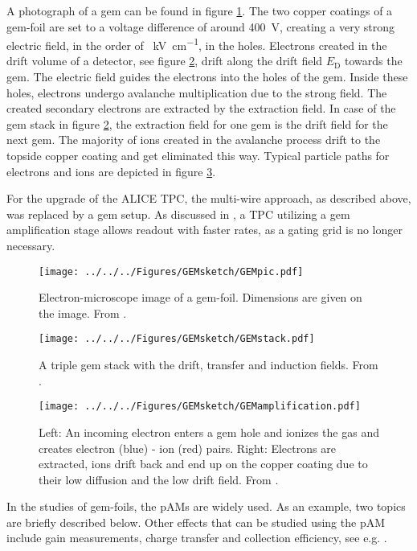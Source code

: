 A photograph of a \ac{gem} can be found in figure \ref{fig:theory:gem:foto}. The two copper coatings of a \ac{gem}-foil are set to a voltage difference of around \SI{400}{\volt}, creating a very strong electric field, in the order of \SI{}{\kilo\volt\per\centi\meter}, in the holes. 
Electrons created in the drift volume of a detector, see figure \ref{fig:theory:gem:stack}, drift along the drift field $E_\text{D}$ towards the \ac{gem}. The electric field guides the electrons into the holes of the \ac{gem}.
Inside these holes, electrons undergo avalanche multiplication due to the strong field. The created secondary electrons are extracted by the extraction field. In case of the \ac{gem} stack in figure \ref{fig:theory:gem:stack}, the extraction field for one \ac{gem} is the drift field for the next \ac{gem}. The majority of ions created in the avalanche process drift to the topside copper coating and get eliminated this way. Typical particle paths for electrons and ions are depicted in figure \ref{fig:theory:gem:field}.

For the upgrade of the \ac{ALICE} \ac{TPC}, the multi-wire approach, as described above, was replaced by a \ac{gem} setup. As discussed in \cite{gemamplification}, a \ac{TPC} utilizing a \ac{gem} amplification stage allows readout with faster rates, as a gating grid is no longer necessary. 
\begin{figure}
	\centering
	\texttt{[image: ../../../Figures/GEMsketch/GEMpic.pdf]}
	\caption{Electron-microscope image of a \ac{gem}-foil. Dimensions are given on the image. From \cite{sauligem}.}
	\label{fig:theory:gem:foto}
\end{figure}
\begin{figure}
	\centering
	\texttt{[image: ../../../Figures/GEMsketch/GEMstack.pdf]}
	\caption{A triple \ac{gem} stack with the drift, transfer and induction fields. From \cite{sauligas}.}
	\label{fig:theory:gem:stack}
\end{figure}
\begin{figure}
	\centering
	\texttt{[image: ../../../Figures/GEMsketch/GEMamplification.pdf]}
	\caption{Left: An incoming electron enters a \ac{gem} hole and ionizes the gas and creates electron (blue) - ion (red) pairs. Right: Electrons are extracted, ions drift back and end up on the copper coating due to their low diffusion and the low drift field. From \cite{gemamplification}.}
	\label{fig:theory:gem:field}
\end{figure}
In the studies of \ac{gem}-foils, the \acp{pAM} are widely used. As an example, two topics are briefly described below. Other effects that can be studied using the \ac{pAM} include gain measurements, charge transfer and collection efficiency, see e.g. \cite{ottnad2019phd}.
